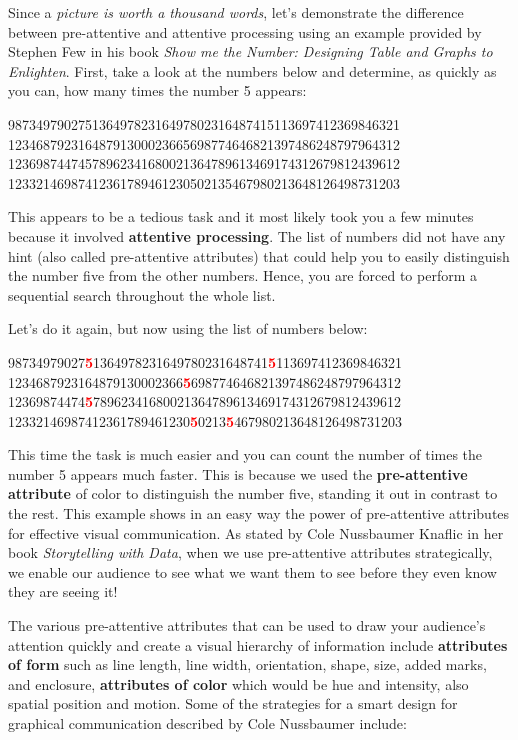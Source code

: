 \documentclass[
]{krantz}
\begin{document}
Since a \emph{picture is worth a thousand words}, let's demonstrate the difference between pre-attentive and attentive processing using an example provided by Stephen Few in his book \emph{Show me the Number: Designing Table and Graphs to Enlighten}. First, take a look at the numbers below and determine, as quickly as you can, how many times the number 5 appears:

98734979027513649782316497802316487415113697412369846321
12346879231648791300023665698774646821397486248797964312
12369874474578962341680021364789613469174312679812439612
12332146987412361789461230502135467980213648126498731203

This appears to be a tedious task and it most likely took you a few minutes because it involved \textbf{attentive processing}. The list of numbers did not have any hint (also called pre-attentive attributes) that could help you to easily distinguish the number five from the other numbers. Hence, you are forced to perform a sequential search throughout the whole list.

Let's do it again, but now using the list of numbers below:

98734979027\textcolor{red}{\textbf{5}}1364978231649780231648741\textcolor{red}{\textbf{5}}113697412369846321
1234687923164879130002366\textcolor{red}{\textbf{5}}698774646821397486248797964312
12369874474\textcolor{red}{\textbf{5}}78962341680021364789613469174312679812439612
12332146987412361789461230\textcolor{red}{\textbf{5}}0213\textcolor{red}{\textbf{5}}467980213648126498731203

This time the task is much easier and you can count the number of times the number 5 appears much faster. This is because we used the \textbf{pre-attentive attribute} of color to distinguish the number five, standing it out in contrast to the rest. This example shows in an easy way the power of pre-attentive attributes for effective visual communication. As stated by Cole Nussbaumer Knaflic in her book \emph{Storytelling with Data}, when we use pre-attentive attributes strategically, we enable our audience to see what we want them to see before they even know they are seeing it!

The various pre-attentive attributes that can be used to draw your audience's attention quickly and create a visual hierarchy of information include \textbf{attributes of form} such as line length, line width, orientation, shape, size, added marks, and enclosure, \textbf{attributes of color} which would be hue and intensity, also spatial position and motion. Some of the strategies for a smart design for graphical communication described by Cole Nussbaumer include:
\end{document}
